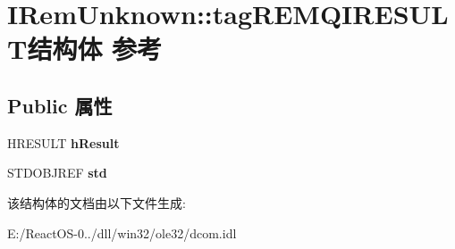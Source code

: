 \hypertarget{struct_i_rem_unknown_1_1tag_r_e_m_q_i_r_e_s_u_l_t}{}\section{I\+Rem\+Unknown\+:\+:tag\+R\+E\+M\+Q\+I\+R\+E\+S\+U\+L\+T结构体 参考}
\label{struct_i_rem_unknown_1_1tag_r_e_m_q_i_r_e_s_u_l_t}
\subsection*{Public 属性}
\begin{DoxyCompactItemize}
\item 
\mbox{\label{struct_i_rem_unknown_1_1tag_r_e_m_q_i_r_e_s_u_l_t_a517067c97eae33bc86e8b9fbc18cdf28}} 
H\+R\+E\+S\+U\+LT {\bfseries h\+Result}
\item 
\mbox{\label{struct_i_rem_unknown_1_1tag_r_e_m_q_i_r_e_s_u_l_t_ac91d1166f221d91b9170f17ab7d51944}} 
S\+T\+D\+O\+B\+J\+R\+EF {\bfseries std}
\end{DoxyCompactItemize}


该结构体的文档由以下文件生成\+:\begin{DoxyCompactItemize}
\item 
E\+:/\+React\+O\+S-\/0../dll/win32/ole32/dcom.\+idl\end{DoxyCompactItemize}
